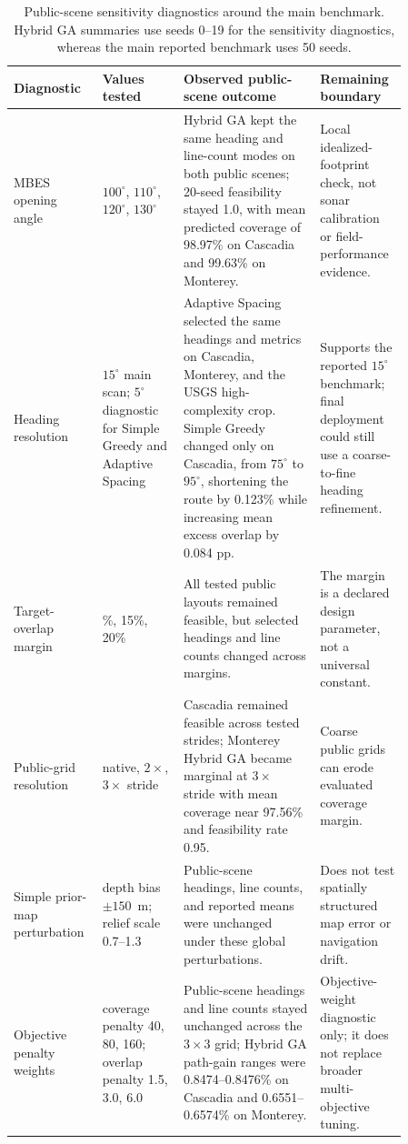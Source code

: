 \documentclass[jmse,article,submit,moreauthors]{Definitions/mdpi}
\begin{document}
\begin{table}[!htbp]
	\centering
	\caption{Public-scene sensitivity diagnostics around the main benchmark. Hybrid GA summaries use seeds 0--19 for the sensitivity diagnostics, whereas the main reported benchmark uses 50 seeds.}
	\label{tab:sensitivity_diagnostics}
	\scriptsize
	\renewcommand{\arraystretch}{1.12}
	\setlength{\tabcolsep}{3.0pt}
	\begin{tabular}{@{}>{\raggedright\arraybackslash}p{0.17\linewidth}>{\raggedright\arraybackslash}p{0.19\linewidth}>{\raggedright\arraybackslash}p{0.32\linewidth}>{\raggedright\arraybackslash}p{0.18\linewidth}@{}}
		\toprule[1bp]
		\textbf{Diagnostic} & \textbf{Values tested} & \textbf{Observed public-scene outcome} & \textbf{Remaining boundary} \\
		\midrule[1bp]
		MBES opening angle & \(100^{\circ}\), \(110^{\circ}\), \(120^{\circ}\), \(130^{\circ}\) & Hybrid GA kept the same heading and line-count modes on both public scenes; 20-seed feasibility stayed 1.0, with mean predicted coverage of 98.97\% on Cascadia and 99.63\% on Monterey. & Local idealized-footprint check, not sonar calibration or field-performance evidence. \\
		Heading resolution & \(15^{\circ}\) main scan; \(5^{\circ}\) diagnostic for Simple Greedy and Adaptive Spacing & Adaptive Spacing selected the same headings and metrics on Cascadia, Monterey, and the USGS high-complexity crop. Simple Greedy changed only on Cascadia, from \(75^{\circ}\) to \(95^{\circ}\), shortening the route by 0.123\% while increasing mean excess overlap by 0.084 pp. & Supports the reported \(15^{\circ}\) benchmark; final deployment could still use a coarse-to-fine heading refinement. \\
		Target-overlap margin & 10\%, 15\%, 20\% & All tested public layouts remained feasible, but selected headings and line counts changed across margins. & The margin is a declared design parameter, not a universal constant. \\
		Public-grid resolution & native, \(2\times\), \(3\times\) stride & Cascadia remained feasible across tested strides; Monterey Hybrid GA became marginal at \(3\times\) stride with mean coverage near 97.56\% and feasibility rate 0.95. & Coarse public grids can erode evaluated coverage margin. \\
		Simple prior-map perturbation & depth bias \(\pm150\)~m; relief scale 0.7--1.3 & Public-scene headings, line counts, and reported means were unchanged under these global perturbations. & Does not test spatially structured map error or navigation drift. \\
		Objective penalty weights & coverage penalty 40, 80, 160; overlap penalty 1.5, 3.0, 6.0 & Public-scene headings and line counts stayed unchanged across the \(3\times3\) grid; Hybrid GA path-gain ranges were 0.8474--0.8476\% on Cascadia and 0.6551--0.6574\% on Monterey. & Objective-weight diagnostic only; it does not replace broader multi-objective tuning. \\
		\bottomrule[1bp]
	\end{tabular}
\end{table}
\end{document}
